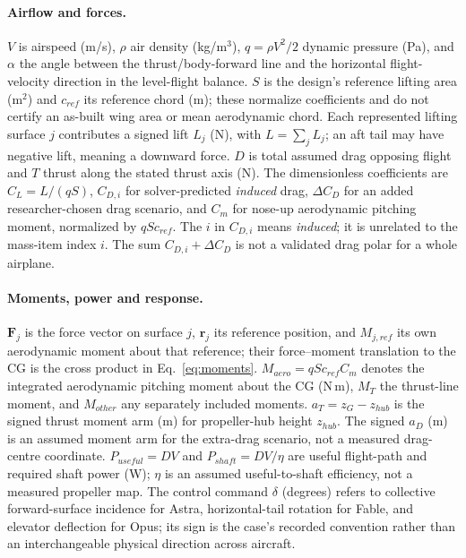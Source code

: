 \documentclass[11pt,a4paper]{article}
\begin{document}
\paragraph{Airflow and forces.} $V$ is airspeed (m/s), $\rho$ air density (kg/m$^3$), $q=\rho V^2/2$ dynamic pressure (Pa), and $\alpha$ the angle between the thrust/body-forward line and the horizontal flight-velocity direction in the level-flight balance. $S$ is the design's reference lifting area (m$^2$) and $c_{ref}$ its reference chord (m); these normalize coefficients and do not certify an as-built wing area or mean aerodynamic chord. Each represented lifting surface $j$ contributes a signed lift $L_j$ (N), with $L=\sum_j L_j$; an aft tail may have negative lift, meaning a downward force. $D$ is total assumed drag opposing flight and $T$ thrust along the stated thrust axis (N). The dimensionless coefficients are $C_L=L/(qS)$, $C_{D,i}$ for solver-predicted \emph{induced} drag, $\Delta C_D$ for an added researcher-chosen drag scenario, and $C_m$ for nose-up aerodynamic pitching moment, normalized by $qSc_{ref}$. The $i$ in $C_{D,i}$ means \emph{induced}; it is unrelated to the mass-item index $i$. The sum $C_{D,i}+\Delta C_D$ is not a validated drag polar for a whole airplane.

\paragraph{Moments, power and response.} $\boldsymbol F_j$ is the force vector on surface $j$, $\boldsymbol r_j$ its reference position, and $M_{j,ref}$ its own aerodynamic moment about that reference; their force--moment translation to the CG is the cross product in Eq.~\ref{eq:moments}. $M_{aero}=qSc_{ref}C_m$ denotes the integrated aerodynamic pitching moment about the CG (N\,m), $M_T$ the thrust-line moment, and $M_{other}$ any separately included moments. $a_T=z_G-z_{hub}$ is the signed thrust moment arm (m) for propeller-hub height $z_{hub}$. The signed $a_D$ (m) is an assumed moment arm for the extra-drag scenario, not a measured drag-centre coordinate. $P_{useful}=DV$ and $P_{shaft}=DV/\eta$ are useful flight-path and required shaft power (W); $\eta$ is an assumed useful-to-shaft efficiency, not a measured propeller map. The control command $\delta$ (degrees) refers to collective forward-surface incidence for Astra, horizontal-tail rotation for Fable, and elevator deflection for Opus; its sign is the case's recorded convention rather than an interchangeable physical direction across aircraft.
\end{document}
